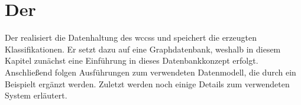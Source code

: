 \section{Der {\classificationStorage}}
    \label{section:solutionDetailsPersistence}
    Der {\classificationStorage} realisiert die Datenhaltung des \glspl{wccs}
    und speichert die erzeugten Klassifikationen.
    Er setzt dazu auf eine Graphdatenbank,
    weshalb in diesem Kapitel zunächst eine Einführung
    in dieses Datenbankkonzept erfolgt.
    Anschließend folgen Ausführungen zum verwendeten Datenmodell,
    die durch ein Beispielt ergänzt werden.
    Zuletzt werden noch einige Details zum verwendeten System erläutert.

    
    
    
    
